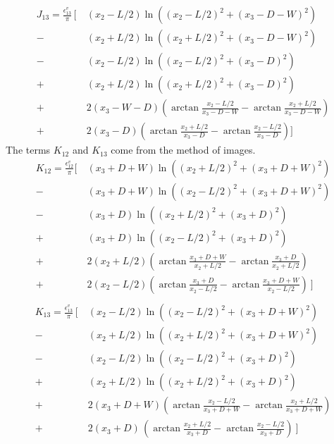\documentclass[letterpaper,12pt,]{memoir}
\begin{document}
 \begin{equation}
 \begin{aligned}
J_{13}=\frac{\epsilon_{13}^v}{\pi}\, \bigg[~&
   \left(x_2-L/2\right) \ln \left((x_2-L/2)^2+(x_3-D-W)^2\right)\\
-& \left(x_2+L/2\right) \ln \left((x_2+L/2)^2+(x_3-D-W)^2\right)\\
-& \left(x_2-L/2\right) \ln \left((x_2-L/2)^2+(x_3-D)^2\right)\\
+& \left(x_2+L/2\right) \ln \left((x_2+L/2)^2+(x_3-D)^2\right)\\
+& 2\left(x_3-W-D\right)\left(\arctan\frac {x_2-L/2}{x_3-D-W}-\arctan\frac {x_2+L/2}{x_3-D-W}\right)\\
+& 2\left(x_3-D\right) \left(\arctan\frac {x_2+L/2}{x_3-D}-\arctan\frac {x_2-L/2}{x_3-D}\right)\bigg] 
 \end{aligned}
 \end{equation}
The terms $K_{12}$ and $K_{13}$ come from the method of images.
 \begin{equation}
 \begin{aligned}
K_{12}=\frac{\epsilon_{12}^v}{\pi}\bigg[~&
 \left( x_3+D+W \right) \ln \left((x_2+L/2)^2+(x_3+D+W)^2\right)\\
-&\left( x_3+D+W \right) \ln \left((x_2-L/2)^2+(x_3+D+W)^2\right)\\
-& \left( x_3+D \right) \ln \left((x_2+L/2)^2+(x_3+D)^2\right)\\
+& \left( x_3+D \right) \ln \left((x_2-L/2)^2+(x_3+D)^2\right)\\
+& 2\left( x_2+L/2 \right) \left(\arctan \frac {x_3+D+W}{x_2+L/2}-\arctan \frac {x_3+D}{x_2+L/2}\right)\\
+& 2\left( x_2-L/2 \right) \left(\arctan \frac {x_3+D}{x_2-L/2}-\arctan \frac {x_3+D+W}{x_2-L/2}\right) ~\bigg]\\
 \end{aligned}
 \end{equation}
 \begin{equation}
 \begin{aligned}
K_{13}=\frac{\epsilon_{13}^v}{\pi}\, \bigg[~& 
\left( x_2-L/2 \right) \ln  \left( (x_2-L/2)^2+(x_3+D+W)^2 \right)\\
-& \left( x_2+L/2 \right) \ln \left( (x_2+L/2)^2+(x_3+D+W)^2 \right)\\
 -& \left( x_2-L/2 \right) \ln  \left( (x_2-L/2)^2+(x_3+D)^2 \right)\\
 +& \left( x_2+L/2 \right) \ln  \left( (x_2+L/2)^2+(x_3+D)^2 \right)\\
 +&2\left( x_3+D+W\right)\left(\arctan\frac {x_2-L/2}{x_3+D+W}-\arctan\frac {x_2+L/2}{x_3+D+W}\right)\\
 +&2\left(x_3+D\right)\, \left(\arctan\frac {x_2+L/2}{x_3+D}-\arctan\frac {x_2-L/2}{x_3+D}\right)  ~\bigg] 
 \end{aligned}
 \end{equation}
\end{document}
